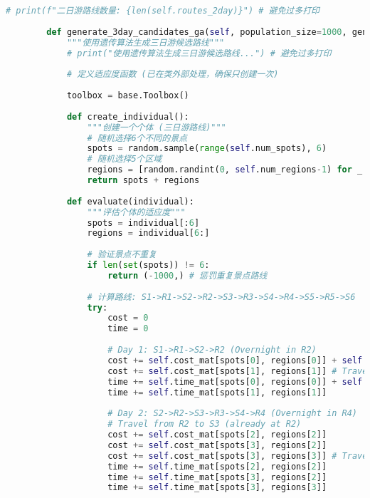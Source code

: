 \begin{lstlisting}[language=Python]
            # print(f"二日游路线数量: {len(self.routes_2day)}") # 避免过多打印
        
        def generate_3day_candidates_ga(self, population_size=1000, generations=50, candidate_size=5000):
            """使用遗传算法生成三日游候选路线"""
            # print("使用遗传算法生成三日游候选路线...") # 避免过多打印
            
            # 定义适应度函数 (已在类外部处理，确保只创建一次)
            
            toolbox = base.Toolbox()
            
            def create_individual():
                """创建一个个体 (三日游路线)"""
                # 随机选择6个不同的景点
                spots = random.sample(range(self.num_spots), 6)
                # 随机选择5个区域
                regions = [random.randint(0, self.num_regions-1) for _ in range(5)]
                return spots + regions
            
            def evaluate(individual):
                """评估个体的适应度"""
                spots = individual[:6]
                regions = individual[6:]
                
                # 验证景点不重复
                if len(set(spots)) != 6:
                    return (-1000,) # 惩罚重复景点路线
                
                # 计算路线: S1->R1->S2->R2->S3->R3->S4->R4->S5->R5->S6
                try:
                    cost = 0
                    time = 0
                    
                    # Day 1: S1->R1->S2->R2 (Overnight in R2)
                    cost += self.cost_mat[spots[0], regions[0]] + self.cost_mat[spots[1], regions[0]]
                    cost += self.cost_mat[spots[1], regions[1]] # Travel from S2 to R2 for overnight
                    time += self.time_mat[spots[0], regions[0]] + self.time_mat[spots[1], regions[0]]
                    time += self.time_mat[spots[1], regions[1]]
                    
                    # Day 2: S2->R2->S3->R3->S4->R4 (Overnight in R4)
                    # Travel from R2 to S3 (already at R2)
                    cost += self.cost_mat[spots[2], regions[2]]
                    cost += self.cost_mat[spots[3], regions[2]]
                    cost += self.cost_mat[spots[3], regions[3]] # Travel from S4 to R4 for overnight
                    time += self.time_mat[spots[2], regions[2]]
                    time += self.time_mat[spots[3], regions[2]]
                    time += self.time_mat[spots[3], regions[3]]
                    

\end{lstlisting}
